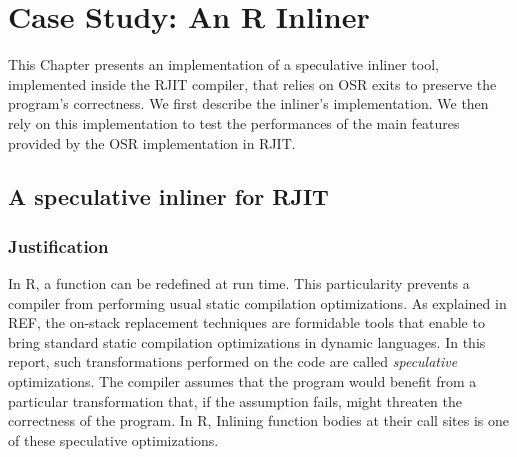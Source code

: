 
\chapter{Case Study: An R Inliner} %

\label{Chapter5} %


\newcommand{\keyword}[1]{\textbf{#1}}
\newcommand{\tabhead}[1]{\textbf{#1}}
\newcommand{\code}[1]{\texttt{#1}}
\newcommand{\file}[1]{\texttt{\bfseries#1}}
\newcommand{\option}[1]{\texttt{\itshape#1}}

This Chapter presents an implementation of a speculative inliner tool, implemented inside the RJIT compiler, that relies on OSR exits to preserve the program's correctness.
We first describe the inliner's implementation.
We then rely on this implementation to test the performances of the main features provided by the OSR implementation in RJIT.\\

\section{A speculative inliner for RJIT}
\subsection{Justification}
In R, a function can be redefined at run time.
This particularity prevents a compiler from performing usual static compilation optimizations.
As explained in REF, the on-stack replacement techniques are formidable tools that enable to bring standard static compilation optimizations in dynamic languages.
In this report, such transformations performed on the code are called \textit{speculative} optimizations.
The compiler assumes that the program would benefit from a particular transformation that, if the assumption fails, might threaten the correctness of the program.
In R, Inlining function bodies at their call sites is one of these speculative optimizations.\\

